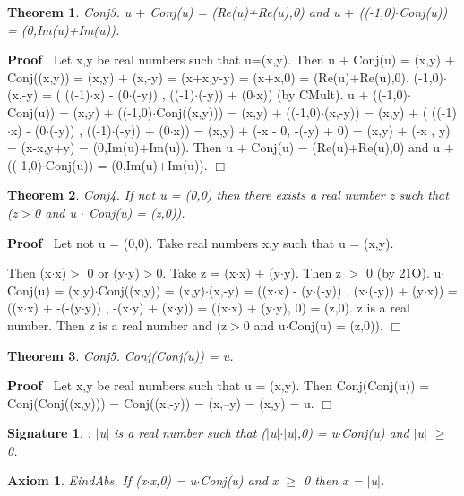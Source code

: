 \documentclass{article}
\newenvironment{forthel}{\begin{leftbar}}{\end{leftbar}}
\newenvironment{proof}{\noindent\textbf{Proof\ }}{\hspace*{\fill}$\Box$\medskip}
\newtheorem{axiom}{Axiom}
\newtheorem{theorem}{Theorem}
\newtheorem{signature}{Signature}
\newcommand{\cmul}{\cdot}
\newcommand{\cadd}{+}
\begin{document}
\begin{forthel}
\begin{theorem}
 Conj3. u $\cadd$ Conj(u) = (Re(u)+Re(u),0) and u $\cadd$ ((-1,0)$\cmul$Conj(u)) = (0,Im(u)+Im(u)).
\end{theorem}\begin{proof}
 Let x,y be real numbers such that u=(x,y).
Then u $\cadd$ Conj(u) = (x,y) $\cadd$ Conj((x,y)) = (x,y) $\cadd$ (x,-y) = (x+x,y-y) = (x+x,0) = (Re(u)+Re(u),0).
(-1,0)$\cmul$(x,-y) = ( ((-1)$\cdot$x) - (0$\cdot$(-y)) , ((-1)$\cdot$(-y)) + (0$\cdot$x)) (by CMult).
u $\cadd$ ((-1,0)$\cmul$Conj(u))	= (x,y) $\cadd$ ((-1,0)$\cmul$Conj((x,y))) = (x,y) $\cadd$ ((-1,0)$\cmul$(x,-y)) 
= (x,y) $\cadd$ ( ((-1)$\cdot$x) - (0$\cdot$(-y)) , ((-1)$\cdot$(-y)) + (0$\cdot$x))
= (x,y) $\cadd$ (-x - 0, -(-y) + 0)
= (x,y) $\cadd$ (-x , y) = (x-x,y+y) = (0,Im(u)+Im(u)).
Then u $\cadd$ Conj(u) = (Re(u)+Re(u),0) and u $\cadd$ ((-1,0)$\cmul$Conj(u)) = (0,Im(u)+Im(u)).
\end{proof}
	   

\begin{theorem}
 Conj4. If not u = (0,0) then there exists a real number z such that (z$>$0 and u $\cmul$ Conj(u) = (z,0)).
\end{theorem}\begin{proof}
	Let not u = (0,0).
Take real numbers x,y such that u = (x,y).

Then (x$\cdot$x)$>$ 0 or (y$\cdot$y)$>$0. Take z = (x$\cdot$x) + (y$\cdot$y). 
Then z $>$ 0 (by 21O).
u$\cmul$Conj(u) = (x,y)$\cmul$Conj((x,y)) = (x,y)$\cmul$(x,-y) = ((x$\cdot$x) - (y$\cdot$(-y)) , (x$\cdot$(-y)) + (y$\cdot$x)) = ((x$\cdot$x) + -(-(y$\cdot$y)) , -(x$\cdot$y) + (x$\cdot$y)) = ((x$\cdot$x) + (y$\cdot$y), 0) = (z,0).
z is a real number.
Then z is a real number and (z$>$0 and u$\cmul$Conj(u) = (z,0)).
\end{proof}


\begin{theorem}
 Conj5. Conj(Conj(u)) = u.
\end{theorem}\begin{proof}
 	Let x,y be real numbers such that u = (x,y).
Then Conj(Conj(u)) = Conj(Conj((x,y))) = Conj((x,-y)) = (x,--y) = (x,y) = u. \end{proof}



\begin{signature}. $|$u$|$ is a real number such that ($|$u$|$$\cdot$$|$u$|$,0) = u$\cmul$Conj(u) and $|$u$|$ $\geq$ 0. 

\end{signature}
\begin{axiom}  EindAbs. If (x$\cdot$x,0) = u$\cmul$Conj(u) and x $\geq$ 0 then x = $|$u$|$.


\end{axiom}
\end{forthel}
\end{document}
